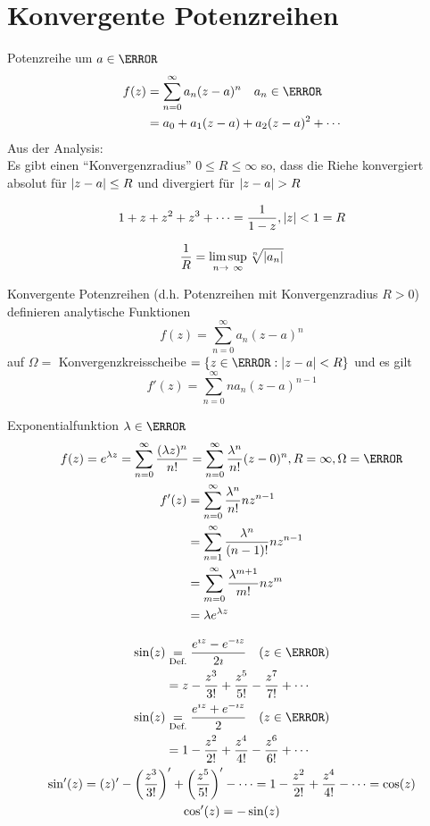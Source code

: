 \section{Konvergente Potenzreihen}
Potenzreihe um $a \in \C$
\[ \begin{split}
	f(z)	&= \sum_{n = 0}^\infty a_n (z-a)^n \quad a_n \in \C \\
		&= a_0 + a_1 (z-a) + a_2 (z-a)^2 + \dotsb
\end{split} \]
Aus der Analysis: \\
Es gibt einen \enquote{Konvergenzradius} $0 \leq R \leq \infty$ so, dass die Riehe konvergiert absolut für $\abs{z-a} \leq R$ und divergiert für $\abs{z-a} > R$ \\
\begin{bsp*}
	\[ 1 + z + z^2 + z^3 + \dotsb = \frac{1}{1 - z} , \abs{z} < 1 = R \]
\end{bsp*}
\[ \frac{1}{R} = \limsup_{n \rightarrow \infty} \sqrt[n]{\abs{a_n}} \]
\begin{satz*}
	Konvergente Potenzreihen (d.h. Potenzreihen mit Konvergenzradius $R > 0$) definieren analytische Funktionen
	\[ f(z) = \sum_{n = 0}^\infty a_n (z-a)^n \]
	auf $\Omega =$ Konvergenzkreisscheibe $= \{ z \in \C : \abs{z-a} < R \}$ und es gilt
	\[ f'(z) = \sum_{n = 0}^\infty n a_n (z-a)^{n-1} \]
\end{satz*}
\begin{bsp}
	Exponentialfunktion $\lambda \in \C$
	\begin{gather*}
		f(z) = e^{\lambda z} = \sum_{n = 0}^\infty \frac{(\lambda z)^n}{n!} = \sum_{n = 0}^\infty \frac{\lambda^n}{n!} (z-0)^n , R = \infty , \Omega = \C \\
		\begin{split}
			f'(z)	&= \sum_{n=0}^\infty \frac{\lambda^n}{n!} n z^{n-1} \\
				&= \sum_{n=1}^\infty \frac{\lambda^n}{(n-1)!} n z^{n-1} \\
				&= \sum_{m=0}^\infty \frac{\lambda^{m+1}}{m!} n z^m \\
				&= \lambda e^{\lambda z}
		\end{split}
	\end{gather*}
\end{bsp}
\begin{gather*}
	\begin{split}
		\sin(z)	&\underset{\text{Def.}}{=} \frac{e^{\imath z} - e^{-\imath z}}{2\imath} \quad (z \in \C) \\
				&= z - \frac{z^3}{3!} + \frac{z^5}{5!} - \frac{z^7}{7!} + \dotsb
	\end{split} \\
	\begin{split}
		\sin(z)	&\underset{\text{Def.}}{=} \frac{e^{\imath z} + e^{-\imath z}}{2} \quad (z \in \C) \\
				&= 1 - \frac{z^2}{2!} + \frac{z^4}{4!} - \frac{z^6}{6!} + \dotsb
	\end{split} \\
	\sin'(z) = (z)' - \left( \frac{z^3}{3!} \right)' + \left( \frac{z^5}{5!} \right)' - \dotsb = 1 - \frac{z^2}{2!} + \frac{z^4}{4!} -\dotsb = \cos(z) \\
	\cos'(z) = -\sin(z)
\end{gather*}

